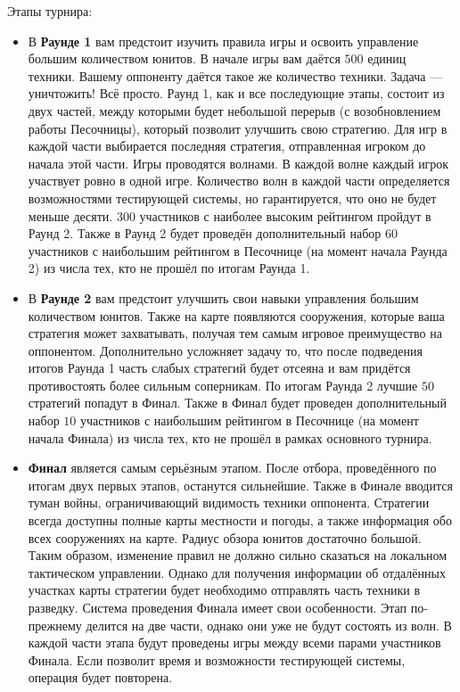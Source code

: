 Этапы турнира:
\begin{itemize}
  \item В \textbf{Раунде 1} вам предстоит изучить правила игры и освоить управление большим количеством юнитов. В начале игры вам даётся
        $500$ единиц техники. Вашему оппоненту даётся такое же количество техники. Задача --- уничтожить! Всё просто. Раунд 1, как и все
        последующие этапы, состоит из двух частей, между которыми будет небольшой перерыв (с возобновлением работы Песочницы), который
        позволит улучшить свою стратегию. Для игр в каждой части выбирается последняя стратегия, отправленная игроком до начала этой части.
        Игры проводятся волнами. В каждой волне каждый игрок участвует ровно в одной игре. Количество волн в каждой части определяется
        возможностями тестирующей системы, но гарантируется, что оно не будет меньше десяти. $300$ участников с наиболее высоким рейтингом
        пройдут в Раунд 2. Также в Раунд 2 будет проведён дополнительный набор $60$ участников с наибольшим рейтингом в Песочнице (на момент
        начала Раунда 2) из числа тех, кто не прошёл по итогам Раунда 1.
  \item В \textbf{Раунде 2} вам предстоит улучшить свои навыки управления большим количеством юнитов. Также на карте появляются сооружения,
        которые ваша стратегия может захватывать, получая тем самым игровое преимущество на оппонентом. Дополнительно усложняет задачу то,
        что после подведения итогов Раунда 1 часть слабых стратегий будет отсеяна и вам придётся противостоять более сильным соперникам. По
        итогам Раунда 2 лучшие $50$ стратегий попадут в Финал. Также в Финал будет проведен дополнительный набор $10$ участников с
        наибольшим рейтингом в Песочнице (на момент начала Финала) из числа тех, кто не прошёл в рамках основного турнира.
  \item \textbf{Финал} является самым серьёзным этапом. После отбора, проведённого по итогам двух первых этапов, останутся сильнейшие. Также
        в Финале вводится туман войны, ограничивающий видимость техники оппонента. Стратегии всегда доступны полные карты местности и
        погоды, а также информация обо всех сооружениях на карте. Радиус обзора юнитов достаточно большой. Таким образом, изменение правил
        не должно сильно сказаться на локальном тактическом управлении. Однако для получения информации об отдалённых участках карты
        стратегии будет необходимо отправлять часть техники в разведку. Система проведения Финала имеет свои особенности. Этап по-прежнему
        делится на две части, однако они уже не будут состоять из волн. В каждой части этапа будут проведены игры между всеми парами
        участников Финала. Если позволит время и возможности тестирующей системы, операция будет повторена.
\end{itemize}

